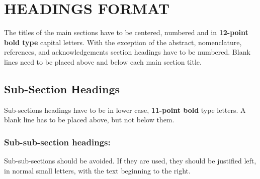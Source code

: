 \section{HEADINGS FORMAT}
\label{sec:headings}

The titles of the main sections have to be centered, numbered and in \textbf{12-point bold type} capital letters. With the exception of the abstract, nomenclature, references, and acknowledgements section headings have to be numbered. Blank lines need to be placed above and below each main section title.

\subsection{Sub-Section Headings}
Sub-sections headings have to be in lower case, \textbf{11-point bold} type letters. A blank line has to be placed above, but not below them.

\subsubsection{Sub-sub-section headings:} Sub-sub-sections should be avoided. If they are used, they should be justified left, in normal small letters, with the text beginning to the right.